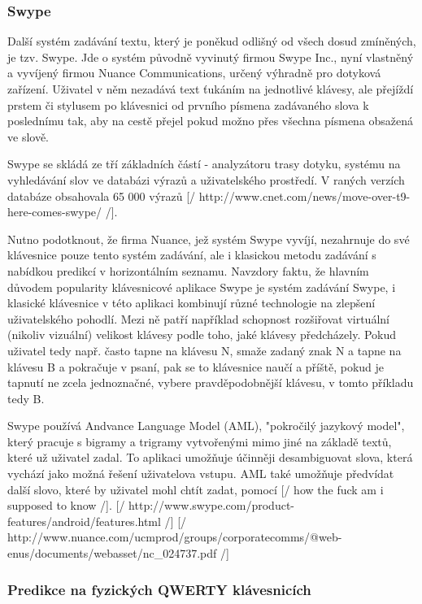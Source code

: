 \documentclass{article}
\begin{document}
\subsubsection{Swype}

Další systém zadávání textu, který je poněkud odlišný od všech dosud zmíněných, je tzv. Swype. Jde o systém původně vyvinutý firmou Swype Inc., nyní vlastněný a vyvíjený firmou Nuance Communications, určený výhradně pro dotyková zařízení. Uživatel v něm nezadává text ťukáním na jednotlivé klávesy, ale přejíždí prstem či stylusem po klávesnici od prvního písmena zadávaného slova k poslednímu tak, aby na cestě přejel pokud možno přes všechna písmena obsažená ve slově.

Swype se skládá ze tří základních částí - analyzátoru trasy dotyku, systému na vyhledávání slov ve databázi výrazů a uživatelského prostředí. V raných verzích databáze obsahovala 65 000 výrazů [/ http://www.cnet.com/news/move-over-t9-here-comes-swype/ /]. %

Nutno podotknout, že firma Nuance, jež systém Swype vyvíjí, nezahrnuje do své klávesnice pouze tento systém zadávání, ale i klasickou metodu zadávání s nabídkou predikcí v horizontálním seznamu. Navzdory faktu, že hlavním důvodem popularity klávesnicové aplikace Swype je systém zadávání Swype, i klasické klávesnice v této aplikaci kombinují různé technologie na zlepšení uživatelského pohodlí. Mezi ně patří například schopnost rozšiřovat virtuální (nikoliv vizuální) velikost klávesy podle toho, jaké klávesy předcházely. Pokud uživatel tedy např. často tapne na klávesu N, smaže zadaný znak N a tapne na klávesu B a pokračuje v psaní, pak se to klávesnice naučí a příště, pokud je tapnutí ne zcela jednoznačné, vybere pravděpodobnější klávesu, v tomto příkladu tedy B. 

Swype používá Andvance Language Model (AML), "pokročilý jazykový model", který pracuje s bigramy a trigramy vytvořenými mimo jiné na základě textů, které už uživatel zadal. To aplikaci umožňuje účinněji desambiguovat slova, která vychází jako možná řešení uživatelova vstupu. AML také umožňuje předvídat další slovo, které by uživatel mohl chtít zadat, pomocí [/ how the fuck am i supposed to know /]. [/ http://www.swype.com/product-features/android/features.html /] [/ http://www.nuance.com/ucmprod/groups/corporatecomms/@web-enus/documents/webasset/nc\_024737.pdf /]

\subsubsection{Predikce na fyzických QWERTY klávesnicích}
\end{document}
